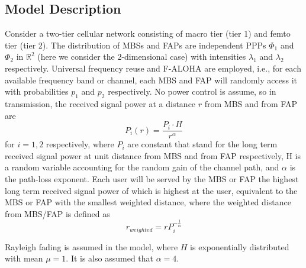 \documentclass[a4paper,twocolumn]{IEEEtran}
\begin{document}
\subsection{Model Description}
Consider a two-tier cellular network consisting of macro tier (tier 1) and femto tier (tier 2). The distribution of MBSs and FAPs are independent PPPs $\Phi_1$ and $\Phi_2$ in $\mathbb{R}^2$ (here we consider the 2-dimensional case) with intensities $\lambda_1$ and $\lambda_2$ respectively. Universal frequency reuse and F-ALOHA are employed, i.e., for each available frequency band or channel, each MBS and FAP will randomly access it with probabilities $p_1$ and $p_2$ respectively. No power control is assume, so in transmission, the received signal power at a distance $r$ from MBS and from FAP are
\begin{equation}
P_i(r)=\frac{P_i \cdot H}{r^\alpha} 
\end{equation}
for $i=1, 2$ respectively, where $P_i$ are constant that stand for the long term received signal power at unit distance from MBS and from FAP respectively, H is a random variable accounting for the random gain of the channel path, and $\alpha$ is the path-loss exponent. Each user will be served by the MBS or FAP the highest long term received signal power of which is highest at the user, equivalent to the MBS or FAP with the smallest weighted distance, where the weighted distance from MBS/FAP is defined as
\begin{equation}
r_{weighted}=r P_i^{-\frac{1}{\alpha}}
\end{equation}

Rayleigh fading is assumed in the model, where $H$ is exponentially distributed with mean $\mu = 1$. It is also assumed that $\alpha = 4$.
\end{document}
